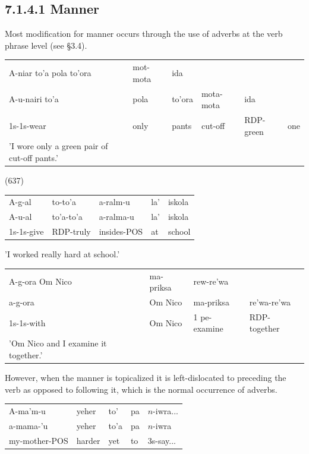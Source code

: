 \documentclass[10pt]{article}
\begin{document}
\subsection*{7.1.4.1 Manner}
Most modification for manner occurs through the use of adverbs at the verb phrase level (see §3.4).

\begin{center}
\begin{tabular}{llllll}
A-niar to'a pola to'ora & mot-mota & ida &  &  &  \\
A-u-nairi to'a & pola & to'ora & mota-mota & ida &  \\
1s-1s-wear & only & pants & cut-off & RDP-green & one \\
'I wore only a green pair of cut-off pants.' &  &  &  &  &  \\
\end{tabular}
\end{center}

(637)

\begin{center}
\begin{tabular}{lllll}
A-g-al & to-to'a & a-ralm-u & la' & iskola \\
A-u-al & to'a-to'a & a-ralma-u & la' & iskola \\
1s-1s-give & RDP-truly & insides-POS & at & school \\
\end{tabular}
\end{center}

'I worked really hard at school.'

\begin{center}
\begin{tabular}{llll}
A-g-ora Om Nico & ma-priksa & rew-re'wa &  \\
a-g-ora & Om Nico & ma-priksa & re'wa-re'wa \\
1s-1s-with & Om Nico & 1 pe-examine & RDP-together \\
'Om Nico and I examine it together.' &  &  &  \\
\end{tabular}
\end{center}

However, when the manner is topicalized it is left-dislocated to preceding the verb as opposed to following it, which is the normal occurrence of adverbs.

\begin{center}
\begin{tabular}{lllll}
A-ma'm-u & yeher & to' & pa & \(n\)-iwra... \\
a-mama-'u & yeher & to'a & pa & \(n\)-iwra \\
my-mother-POS & harder & yet & to & 3s-say... \\
\end{tabular}
\end{center}
\end{document}

